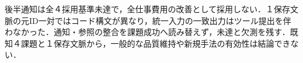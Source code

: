 後半通知は全４採用基準未達で，全仕事費用の改善として採用しない．１保存文脈の元ID一対ではコード構文が異なり，統一入力の一致出力はツール提出を伴わなかった．通知・参照の整合を課題成功へ読み替えず，未達と欠測を残す．既知４課題と１保存文脈から，一般的な品質維持や新規手法の有効性は結論できない．
